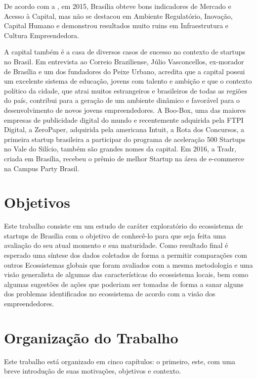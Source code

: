De acordo com a , em 2015, Brasília obteve bons indicadores de Mercado e Acesso à Capital, mas não se destacou em Ambiente Regulatório, Inovação, Capital Humano e demonstrou resultados muito ruins em Infraestrutura e Cultura Empreendedora. 

A capital também é a casa de diversos casos de sucesso no contexto de startups no Brasil. Em entrevista ao Correio Braziliense, Júlio Vasconcellos, ex-morador de Brasília e um dos fundadores do Peixe Urbano, acredita que a capital possui um excelente sistema de educação, jovens com talento e ambição e que o contexto político da cidade, que atrai muitos estrangeiros e brasileiros de todas as regiões do país, contribui para a geração de um ambiente dinâmico e favorável para o desenvolvimento de novos jovens empreendedores. A Boo-Box, uma das maiores empresas de publicidade digital do mundo e recentemente adquirida pela FTPI Digital, a ZeroPaper, adquirida pela americana Intuit, a Rota dos Concursos, a primeira startup brasileira a participar do programa de aceleração 500 Startups no Vale do Silício, também são grandes nomes da capital. Em 2016, a Tradr, criada em Brasília, recebeu o prêmio de melhor Startup na área de e-commerce na Campus Party Brasil.

\section{Objetivos}
\label{section:objetivos}

Este trabalho consiste em um estudo de caráter exploratório do ecossistema de startups de Brasília com o objetivo de conhecê-lo para que seja feita uma avaliação do seu atual momento e sua maturidade. Como resultado final é esperado uma síntese dos dados coletados de forma a permitir comparações com outros Ecossistemas globais que foram avaliados com a mesma metodologia e uma visão generalista de algumas das características do ecossistema locais, bem como algumas sugestões de ações que poderiam ser tomadas de forma a sanar alguns dos problemas identificados no ecossistema de acordo com a visão dos empreendedores.

\section{Organização do Trabalho}
\label{section:organizacao_do_trabalho}

Este trabalho está organizado em cinco capítulos: o primeiro, este, com uma breve introdução de suas motivações, objetivos e contexto. 

